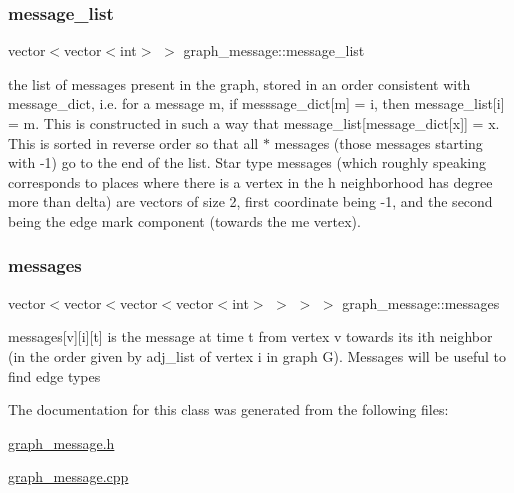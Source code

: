 \mbox{\label{classgraph__message_aa497f561e976cf58cc554a77e0601d8f}} 
\subsubsection{\texorpdfstring{message\+\_\+list}{message\_list}}
{\footnotesize\ttfamily vector$<$vector$<$int$>$ $>$ graph\+\_\+message\+::message\+\_\+list}



the list of messages present in the graph, stored in an order consistent with message\+\_\+dict, i.\+e. for a message m, if messsage\+\_\+dict\mbox{[}m\mbox{]} = i, then message\+\_\+list\mbox{[}i\mbox{]} = m. This is constructed in such a way that message\+\_\+list\mbox{[}message\+\_\+dict\mbox{[}x\mbox{]}\mbox{]} = x. This is sorted in reverse order so that all $\ast$ messages (those messages starting with -\/1) go to the end of the list. Star type messages (which roughly speaking corresponds to places where there is a vertex in the h neighborhood has degree more than delta) are vectors of size 2, first coordinate being -\/1, and the second being the edge mark component (towards the \textquotesingle{}me\textquotesingle{} vertex). 

\mbox{\label{classgraph__message_a06a1d1ab91b4891c65ea80205566f800}} 
\subsubsection{\texorpdfstring{messages}{messages}}
{\footnotesize\ttfamily vector$<$vector$<$vector$<$vector$<$int$>$ $>$ $>$ $>$ graph\+\_\+message\+::messages}



messages\mbox{[}v\mbox{]}\mbox{[}i\mbox{]}\mbox{[}t\mbox{]} is the message at time t from vertex v towards its ith neighbor (in the order given by adj\+\_\+list of vertex i in graph G). Messages will be useful to find edge types 



The documentation for this class was generated from the following files\+:\begin{DoxyCompactItemize}
\item 
\hyperlink{graph__message_8h}{graph\+\_\+message.\+h}\item 
\hyperlink{graph__message_8cpp}{graph\+\_\+message.\+cpp}\end{DoxyCompactItemize}
